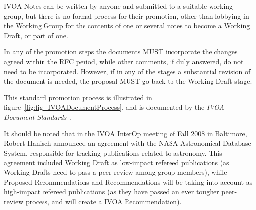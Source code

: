 		 IVOA Notes can be written by anyone and submitted to a
		suitable working group, but there is no formal process for
		their promotion, other than lobbying in the Working Group
		for the contents of one or several notes to become a
		Working Draft, or part of one.
		
		 In any of the promotion steps the documents MUST
		incorporate the changes agreed within the RFC period, while
		other comments, if duly answered, do not need to be
		incorporated. However, if in any of the stages a
		substantial revision of the document is needed, the
		proposal MUST go back to the Working Draft stage.
		
		This standard promotion process is illustrated in
		figure~\ref{fig:fig_IVOADocumentProcess}, and is documented
		by the \emph{IVOA Document
		Standards}~\cite{2009idstdivoav0302H}.
		
		It should be noted that in the IVOA InterOp meeting of Fall
		2008 in Baltimore, Robert Hanisch announced an agreement
		with the NASA Astronomical Database System, responsible for
		tracking publications related to astronomy. This agreement
		included Working Draft as low-impact refereed publications
		(as Working Drafts need to pass a peer-review among group
		members), while Proposed Recommendations and
		Recommendations will be taking into account as high-impact
		refereed publications (as they have passed an ever tougher
		peer-review process, and will create a IVOA
		Recommendation).

